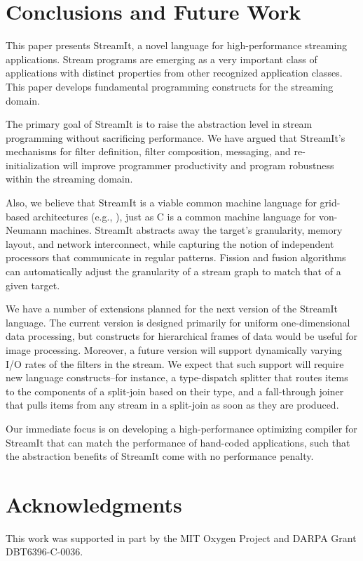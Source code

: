 \section{Conclusions and Future Work}
\label{sec:conc}

This paper presents StreamIt, a novel language for high-performance
streaming applications.  Stream programs are emerging as a very
important class of applications with distinct properties from other
recognized application classes.  This paper develops fundamental
programming constructs for the streaming domain.

The primary goal of StreamIt is to raise the abstraction level in
stream programming without sacrificing performance.  We have argued
that StreamIt's mechanisms for filter definition, filter composition,
messaging, and re-initialization will improve programmer productivity
and program robustness within the streaming domain.

Also, we believe that StreamIt is a viable common machine language for
grid-based architectures (e.g., \cite{smartmemories,rawshort,trips}),
just as C is a common machine language for von-Neumann machines.
StreamIt abstracts away the target's granularity, memory layout, and
network interconnect, while capturing the notion of independent
processors that communicate in regular patterns.  Fission and fusion
algorithms can automatically adjust the granularity of a stream graph
to match that of a given target.

We have a number of extensions planned for the next version of the
StreamIt language.  The current version is designed primarily for
uniform one-dimensional data processing, but constructs for hierarchical
frames of data would be useful for image processing.  Moreover, a future
version will support dynamically varying I/O rates of the filters in the
stream.  We expect that such support will require new language
constructs--for instance, a type-dispatch splitter that routes items to
the components of a split-join based on their type, and a fall-through
joiner that pulls items from any stream in a split-join as soon as they
are produced.

Our  immediate focus  is on  developing a  high-performance optimizing
compiler  for StreamIt that  can match  the performance  of hand-coded
applications, such that the abstraction benefits of StreamIt come with
no performance penalty.

\section*{Acknowledgments}

This work was supported in part by the MIT Oxygen Project and DARPA
Grant DBT6396-C-0036.
